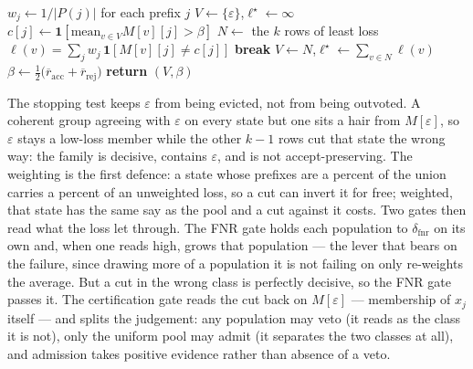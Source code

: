 \begin{algorithm}
\caption{$\textsc{Cluster}(\beta)$: the $\varepsilon$-anchored family and a refreshed split}
\label{alg:cluster}
\begin{algorithmic}[1]
\State $w_j\gets 1/|P(j)|$ for each prefix $j$ 
\State $V\gets\{\varepsilon\}$,\quad $\ell^\star\gets\infty$
\Loop
  \State $c[j]\gets\mathbf 1[\mathrm{mean}_{v\in V}M[v][j]>\beta]$ 
  \State $N\gets$ the $k$ rows of least loss $\ell(v)=\sum_j w_j\,\mathbf 1[M[v][j]\ne c[j]]$
   \textbf{break} \EndIf
  \State $V\gets N$,\quad $\ell^\star\gets\sum_{v\in N}\ell(v)$
\EndLoop
\State $\beta\gets\tfrac12\big(\overline r_{\mathrm{acc}}+\overline r_{\mathrm{rej}}\big)$ 
\State \textbf{return} $(V,\beta)$
\end{algorithmic}
\end{algorithm}

The stopping test keeps $\varepsilon$ from being evicted, not from being outvoted. A
coherent group agreeing with $\varepsilon$ on every state but one sits a hair from
$M[\varepsilon]$, so $\varepsilon$ stays a low-loss member while the other $k-1$ rows
cut that state the wrong way: the family is decisive, contains $\varepsilon$, and is not
accept-preserving. The weighting is the first defence: a state whose prefixes are a
percent of the union carries a percent of an unweighted loss, so a cut can invert it for
free; weighted, that state has the same say as the pool and a cut against it costs. Two
gates then read what the loss let through. The FNR gate holds each population to
$\delta_{\mathrm{fnr}}$ on its own and, when one reads high, grows that population --- the
lever that bears on the failure, since drawing more of a population it is not failing on
only re-weights the average. But a cut in the wrong class is perfectly decisive, so the
FNR gate passes it. The certification gate reads the cut back on $M[\varepsilon]$ ---
membership of $x_j$ itself --- and splits the judgement: any population may veto (it reads
as the class it is not), only the uniform pool may admit (it separates the two classes at
all), and admission takes positive evidence rather than absence of a veto.


